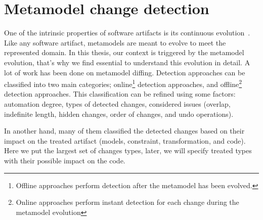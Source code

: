  \section{Metamodel change detection}
 \label{changedetection}
 One of the intrinsic properties of software artifacts is its continuous evolution~\cite{mens2008introduction}. Like any software artifact, metamodels are meant to evolve to meet the represented domain. %
 In this thesis, our context is triggered by the metamodel evolution, that's why we find essential to understand this evolution in detail.
 A lot of work has been done on metamodel diffing.
 Detection approaches can be classified into two main categories; online\footnote{Offline approaches perform detection after the metamodel has been evolved.} detection approaches, and offline\footnote{Online approaches perform instant detection for each change during the metamodel evolution} detection approaches. This classification can be refined using some factors: automation degree, types of detected changes, considered issues (overlap, indefinite length, hidden changes, order of changes, and undo operations)\cite{hebig2016approaches}.
 
 
  In another hand, many of them classified the detected changes based on their impact on the treated artifact (models, constraint, transformation, and code). Here we put the largest set of changes types, later, we will specify treated types with their possible impact on the code.
 

